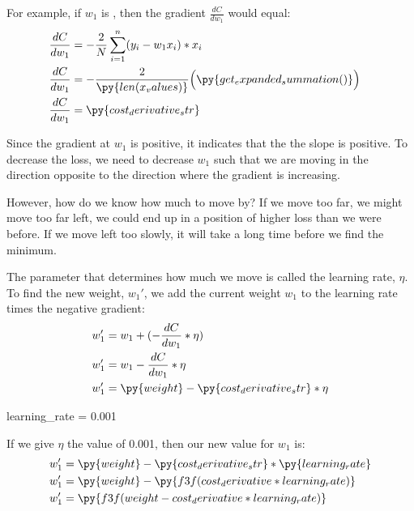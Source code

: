\documentclass[12pt, demo]{article}
\begin{document}
For example, if $w_1$ is , then the gradient $\frac{dC}{dw_1}$ would equal:
\begin{align*}
	\frac{dC}{dw_1} & = -\frac{2}{N} \sum_{i=1}^{n} (y_i - w_1x_i) * x_i
	\\
	\frac{dC}{dw_1} & =
	\begin{aligned}[t]
		-\frac{2}{\py{len(x_values)}}
		\Big( & \py{get_expanded_summation()}\Big)
	\end{aligned}
	\\
	\frac{dC}{dw_1} & = \py{cost_derivative_str}
\end{align*}

Since the gradient at $w_1$ is positive, it indicates that the the slope is positive. To decrease the loss, we need to decrease $w_1$ such that we are moving in the direction opposite to the direction where the gradient is increasing.

However, how do we know how much to move by? If we move too far, we might move too far left, we could end up in a position of higher loss than we were before. If we move left too slowly, it will take a long time before we find the minimum.

The parameter that determines how much we move is called the learning rate, $\eta$. To find the new weight, $w_1'$, we add the current weight $w_1$ to the learning rate times the negative gradient:
\begin{align*}
	w_1' & = w_1 + (-\frac{dC}{dw_1} * \eta)
	\\
	w_1' & = w_1 - \frac{dC}{dw_1} * \eta
	\\
	w_1' & = \py{weight} - \py{cost_derivative_str} * \eta
\end{align*}

\begin{pycode}
learning_rate = 0.001
\end{pycode}

If we give $\eta$ the value of 0.001, then our new value for $w_1$ is:
\begin{align*}
	w_1' & = \py{weight} - \py{cost_derivative_str} * \py{learning_rate}
	\\
	w_1' & = \py{weight} - \py{f3f(cost_derivative * learning_rate)}
	\\
	w_1' & = \py{f3f(weight - cost_derivative * learning_rate)}
\end{align*}
\end{document}
